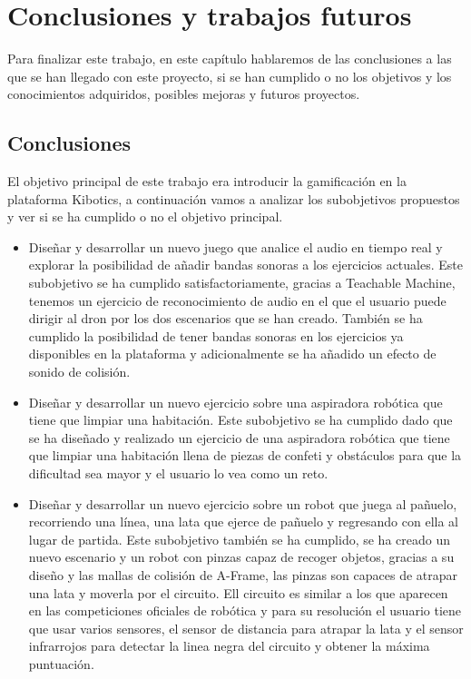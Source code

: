 \chapter{Conclusiones y trabajos futuros}\label{conclusion}
Para finalizar este trabajo, en este capítulo hablaremos de las conclusiones a las que se han llegado con este proyecto, si se han cumplido o no los objetivos y los conocimientos adquiridos, posibles mejoras y futuros proyectos.

\section{Conclusiones}

El objetivo principal de este trabajo era introducir la gamificación en la plataforma Kibotics, a continuación vamos a analizar los subobjetivos propuestos y ver si se ha cumplido o no el objetivo principal.

\begin{itemize}
    \item Diseñar y desarrollar un nuevo juego que analice el audio en tiempo real y explorar la posibilidad de añadir bandas sonoras a los ejercicios actuales.  Este subobjetivo se ha cumplido satisfactoriamente, gracias a Teachable Machine, tenemos un ejercicio de reconocimiento de audio en el que el usuario puede dirigir al dron por los dos escenarios que se han creado. También se ha cumplido la posibilidad de tener bandas sonoras en los ejercicios ya disponibles en la plataforma y adicionalmente se ha añadido un efecto de sonido de colisión. 

    \item Diseñar y desarrollar un nuevo ejercicio sobre una aspiradora robótica que tiene que limpiar una habitación.  Este subobjetivo se ha cumplido dado que se ha  diseñado y realizado un ejercicio de una aspiradora robótica que tiene que limpiar una habitación llena de piezas de confeti y obstáculos para que la dificultad sea mayor y el usuario lo vea como un reto.

    \item Diseñar y desarrollar un nuevo ejercicio sobre un robot que juega al pañuelo, recorriendo una línea, una lata que ejerce de pañuelo y regresando con ella al lugar de partida. Este subobjetivo también se ha cumplido, se ha creado un nuevo escenario y un robot con pinzas capaz de recoger objetos, gracias a su diseño y las mallas de colisión de A-Frame, las pinzas son capaces de atrapar una lata y moverla por el circuito. Ell circuito es similar a los que aparecen en las competiciones oficiales de robótica y para su resolución el usuario tiene que usar varios sensores, el sensor de distancia para atrapar la lata y el sensor infrarrojos para detectar la linea negra del circuito y obtener la máxima puntuación. 
\end{itemize}

